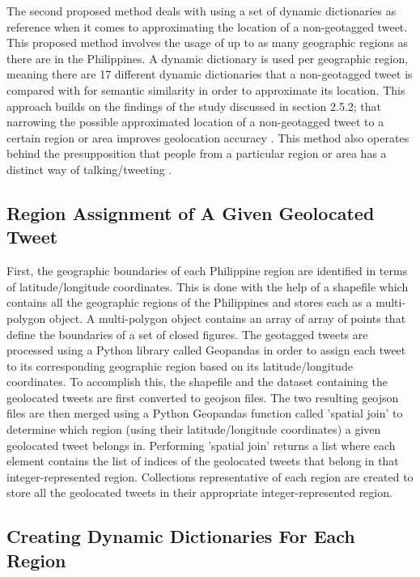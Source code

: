 The second proposed method deals with using a set of dynamic dictionaries as reference when it comes to approximating the location of a non-geotagged tweet. This proposed method involves the usage of up to as many geographic regions as there are in the Philippines.
A dynamic dictionary is used per geographic region, meaning there are 17 different dynamic dictionaries that a non-geotagged tweet is compared with for semantic similarity in order to approximate its location. This approach builds on the findings of the study discussed in section 2.5.2; that narrowing the possible approximated location of a non-geotagged tweet to a certain region or area improves geolocation accuracy \cite{VELASCOBERMEJODOMINGO2018}. This method also operates behind the presupposition that people from a particular region or area has a distinct way of talking/tweeting \cite{ROSALES2017, VELASCOBERMEJODOMINGO2018}.

\subsection{Region Assignment of A Given Geolocated Tweet}

First, the geographic boundaries of each Philippine region are identified in terms of latitude/longitude coordinates. This is done with the help of a shapefile which contains all the geographic regions of the Philippines and stores each as a multi-polygon object. A multi-polygon object contains an array of array of points that define the boundaries of a set of closed figures. The geotagged tweets are processed using a Python library called Geopandas in order to assign each tweet to its corresponding geographic region based on its latitude/longitude coordinates. To accomplish this, the shapefile and the dataset containing the geolocated tweets are first converted to geojson files. The two resulting geojson files are then merged using a Python Geopandas function called 'spatial join' to determine which region (using their latitude/longitude coordinates) a given geolocated tweet belongs in. Performing 'spatial join' returns a list where each element contains the list of indices of the geolocated tweets that belong in that integer-represented region. Collections representative of each region are created to store all the geolocated tweets in their appropriate integer-represented region. 

\subsection{Creating Dynamic Dictionaries For Each Region}

